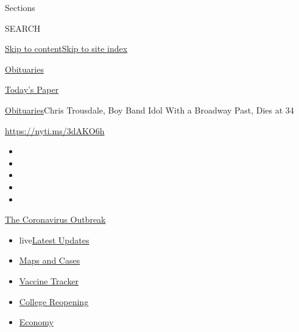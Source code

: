 Sections

SEARCH

\protect\hyperlink{site-content}{Skip to
content}\protect\hyperlink{site-index}{Skip to site index}

\href{https://www.nytimes3xbfgragh.onion/section/obituaries}{Obituaries}

\href{https://myaccount.nytimes3xbfgragh.onion/auth/login?response_type=cookie\&client_id=vi}{}

\href{https://www.nytimes3xbfgragh.onion/section/todayspaper}{Today's
Paper}

\href{/section/obituaries}{Obituaries}\textbar{}Chris Trousdale, Boy
Band Idol With a Broadway Past, Dies at 34

\url{https://nyti.ms/3dAKO6h}

\begin{itemize}
\item
\item
\item
\item
\item
\end{itemize}

\href{https://www.nytimes3xbfgragh.onion/news-event/coronavirus?action=click\&pgtype=Article\&state=default\&region=TOP_BANNER\&context=storylines_menu}{The
Coronavirus Outbreak}

\begin{itemize}
\tightlist
\item
  live\href{https://www.nytimes3xbfgragh.onion/2020/08/04/world/coronavirus-covid-19.html?action=click\&pgtype=Article\&state=default\&region=TOP_BANNER\&context=storylines_menu}{Latest
  Updates}
\item
  \href{https://www.nytimes3xbfgragh.onion/interactive/2020/us/coronavirus-us-cases.html?action=click\&pgtype=Article\&state=default\&region=TOP_BANNER\&context=storylines_menu}{Maps
  and Cases}
\item
  \href{https://www.nytimes3xbfgragh.onion/interactive/2020/science/coronavirus-vaccine-tracker.html?action=click\&pgtype=Article\&state=default\&region=TOP_BANNER\&context=storylines_menu}{Vaccine
  Tracker}
\item
  \href{https://www.nytimes3xbfgragh.onion/2020/08/02/us/covid-college-reopening.html?action=click\&pgtype=Article\&state=default\&region=TOP_BANNER\&context=storylines_menu}{College
  Reopening}
\item
  \href{https://www.nytimes3xbfgragh.onion/live/2020/08/03/business/stock-market-today-coronavirus?action=click\&pgtype=Article\&state=default\&region=TOP_BANNER\&context=storylines_menu}{Economy}
\end{itemize}

